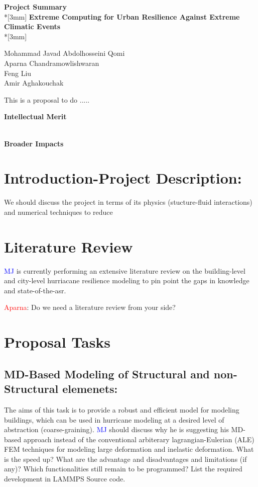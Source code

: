 \documentclass{proposalnsf}
\begin{document}
\begin{center}
{\Large{\bf Project Summary}}\\*[3mm]
{\bf Extreme Computing for Urban Resilience Against Extreme Climatic Events} \\*[3mm]

Mohammad Javad Abdolhosseini Qomi \\
Aparna Chandramowlishwaran \\
Feng Liu \\
Amir Aghakouchak \\

\end{center}


This is a  proposal to do .....



\noindent
{\bf Intellectual Merit}

\ \\

\noindent
{\bf Broader Impacts}

\renewcommand{\thepage} {B--\arabic{page}}

\newpage
\section{Introduction-Project Description:}
We should discuss the project in terms of its physics (stucture-fluid interactions) and numerical techniques to reduce

\section{Literature Review}

\textcolor{blue}{MJ} is currently performing an extensive literature review on the building-level and city-level hurriacane resilience modeling to pin point the gaps in knowledge and state-of-the-asr.

\textcolor{red}{Aparna}: Do we need  a literature review from your side?

\section{Proposal Tasks}

\subsection{MD-Based Modeling of Structural and non-Structural elemenets:} The aims of this task is to provide a robust and efficient model for modeling buildings, which can be used in hurricane modeling at a desired level of abstraction (coarse-graining). \textcolor{blue}{MJ} should discuss why he is suggesting his MD-based approach instead of the conventional arbiterary lagrangian-Eulerian (ALE) FEM techniques for modeling large deformation and inelastic deformation. What is the speed up? What are the advantage and disadvantages and limitations (if any)? Which functionalities still remain to be programmed? List the required development in LAMMPS Source code. 
\end{document}

